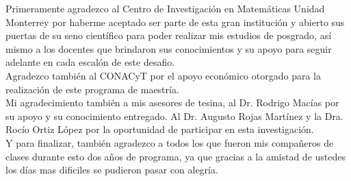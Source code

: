 
\begin{acknowledgements}

  Primeramente agradezco al Centro de Investigaci\'on en Matem\'aticas Unidad Monterrey por haberme aceptado ser parte de esta gran instituci\'on y abierto sus puertas de su seno cient\'ifico para poder realizar mis estudios de posgrado, as\'i mismo a los docentes que brindaron sus conocimientos y su apoyo para seguir adelante en cada escal\'on de este desafio.\\

  Agradezco tambi\'en al CONACyT por el apoyo econ\'omico otorgado para la realizaci\'on de este programa de maestr\'ia.\\

  Mi agradecimiento tambi\'en a mis asesores de tesina, al Dr. Rodrigo Mac\'ias por su apoyo y su conocimiento entregado. Al Dr. Augusto Rojas Mart\'inez y la Dra. Roc\'io Ortiz L\'opez por la oportunidad de participar en esta investigaci\'on.\\

  Y para finalizar, tambi\'en agradezco a todos los que fueron mis compañeros de clases durante esto dos años de programa, ya que gracias a la amistad de ustedes los d\'ias mas dificiles se pudieron pasar con alegr\'ia. 

\end{acknowledgements}




